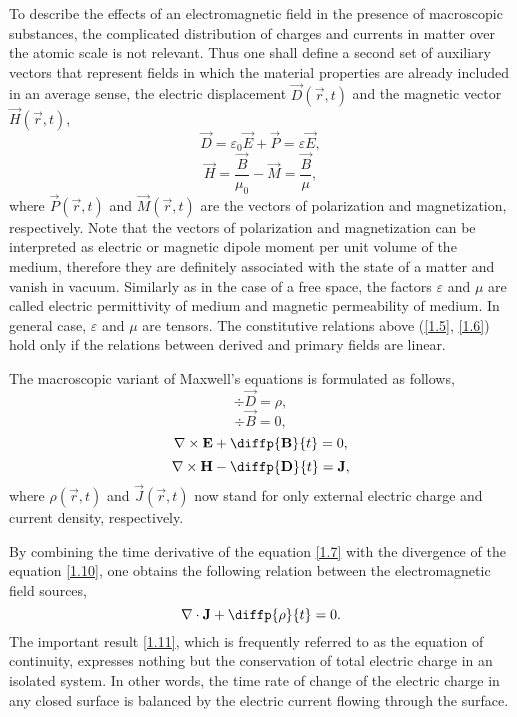To describe the effects of an electromagnetic field in the presence of macroscopic substances, the complicated distribution of charges and currents in matter over the atomic scale is not relevant. Thus one shall define a second set of auxiliary vectors that represent fields in which the material properties are already included in an average sense, the electric displacement $ \vec{D}\left( \vec{r}, t \right) $ and the magnetic vector $ \vec{H}\left( \vec{r}, t \right) $,
\begin{equation}
\label{1.5}
\vec{D} = \varepsilon_0 \vec{E} + \vec{P} = \varepsilon \vec{E},
\end{equation}
\begin{equation}
\label{1.6}
\vec{H} = \frac{\vec{B}}{\mu_0} - \vec{M} = \frac{\vec{B}}{\mu},
\end{equation}
where $ \vec{P}\left( \vec{r}, t \right) $ and $ \vec{M}\left( \vec{r}, t \right) $ are the vectors of polarization and magnetization, respectively. Note that the vectors of polarization and magnetization can be interpreted as electric or magnetic dipole moment per unit volume of the medium, therefore they are definitely associated with the state of a matter and vanish in vacuum. Similarly as in the case of a free space, the factors $ \varepsilon $ and $ \mu $ are called electric permittivity of medium and magnetic permeability of medium. In general case, $ \varepsilon $ and $ \mu $ are tensors. The constitutive relations above (\ref{1.5}, \ref{1.6}) hold only if the relations between derived and primary fields are linear.

The macroscopic variant of Maxwell's equations is formulated as follows,
\begin{equation}
\label{1.7}
\div{\vec{D}} = \rho,
\end{equation}
\begin{equation}
\label{1.8}
\div{\vec{B}} = 0,
\end{equation}
\begin{equation}
\label{1.9}
\rot{\vec{E}} + \diffp{\vec{B}}{t} = 0,
\end{equation}
\begin{equation}
\label{1.10}
\rot{\vec{H}} - \diffp{\vec{D}}{t} = \vec{J},
\end{equation}
where $ \rho\left(\vec{r}, t \right) $ and $ \vec{J}\left(\vec{r}, t \right) $ now stand for only external electric charge and current density, respectively.

By combining the time derivative of the equation \ref{1.7} with the divergence of the equation \ref{1.10}, one obtains the following relation between the electromagnetic field sources,
\begin{equation}
\label{1.11}
\div{\vec{J}} + \diffp{\rho}{t} = 0.
\end{equation}
The important result \ref{1.11}, which is frequently referred to as the equation of continuity, expresses nothing but the conservation of total electric charge in an isolated system. In other words, the time rate of change of the electric charge in any closed surface is balanced by the electric current flowing through the surface.

